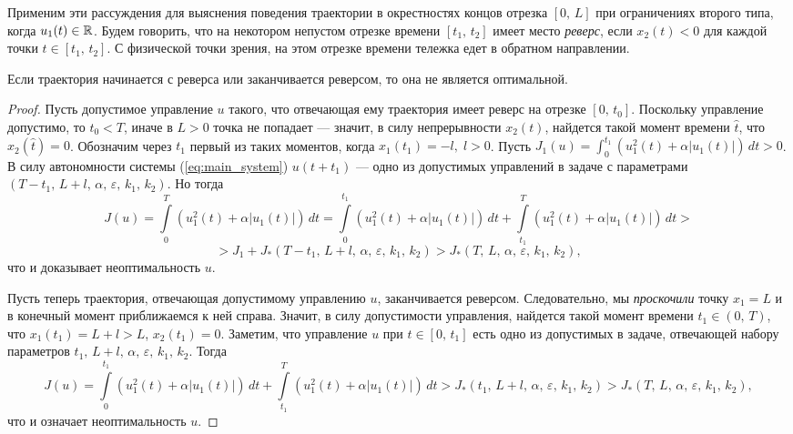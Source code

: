Применим эти рассуждения для выяснения поведения траектории в окрестностях концов отрезка $[0,\,L]$ при ограничениях второго типа, когда $u_1(t) \in \mathbb{R}$. Будем говорить, что на некотором непустом отрезке времени $[t_1,\,t_2]$ имеет место \textit{реверс}, если $x_2(t) < 0$ для каждой точки $t \in [t_1,\,t_2]$. С физической точки зрения, на этом отрезке времени тележка едет в обратном направлении.

\begin{assertion}
Если траектория начинается с реверса или заканчивается реверсом, то она не является оптимальной.
\end{assertion}
\begin{proof}
        Пусть допустимое управление $u$ такого, что отвечающая ему траектория имеет реверс на отрезке $[0,\,t_0]$. Поскольку управление допустимо, то $t_0 < T$, иначе в $L > 0$ точка не попадает --- значит, в силу непрерывности $x_2(t)$, найдется такой момент времени $\hat t$, что $x_2(\hat t) = 0$. Обозначим через $t_1$ первый из таких моментов, когда $x_1(t_1)=-l,\;l>0$. Пусть $J_1(u) = \int_0^{t_1}(u_1^2(t) + \alpha|u_1(t)|)\,dt > 0$. В силу автономности системы (\ref{eq:main_system}) $u(t + t_1)$ --- одно из допустимых управлений в задаче с параметрами $(T-t_1,\, L+l,\,\alpha,\,\varepsilon,\,k_1,\,k_2)$. Но тогда
        $$
                J(u) = \int\limits_0^T (u_1^2(t) + \alpha|u_1(t)|)\,dt = \int\limits_0^{t_1} (u_1^2(t) + \alpha|u_1(t)|)\,dt + \int\limits_{t_1}^T (u_1^2(t) + \alpha|u_1(t)|)\,dt >
        $$
        $$
                > J_1 + J_*(T-t_1,\,L+l,\,\alpha,\,\varepsilon,\,k_1,\,k_2) > J_*(T,\,L,\,\alpha,\,\varepsilon,\,k_1,\,k_2),
        $$
        что и доказывает неоптимальность $u$.

        Пусть теперь траектория, отвечающая допустимому управлению $u$, заканчивается реверсом. Следовательно, мы \textit{проскочили} точку $x_1 = L$ и в конечный момент приближаемся к ней справа. Значит, в силу допустимости управления, найдется такой момент времени $t_1 \in (0,\,T)$, что $x_1(t_1) = L + l > L$, $x_2(t_1) = 0$. Заметим, что управление $u$ при $t \in [0,\,t_1]$ есть одно из допустимых в задаче, отвечающей набору параметров $t_1,\,L+l,\,\alpha,\,\varepsilon,\,k_1,\,k_2$. Тогда
        $$
                J(u) = \int\limits_0^{t_1} (u_1^2(t) + \alpha|u_1(t)|)\,dt + \int\limits_{t_1}^T (u_1^2(t) + \alpha|u_1(t)|)\,dt > J_*(t_1,\,L+l,\,\alpha,\,\varepsilon,\,k_1,\,k_2) > J_*(T,\,L,\,\alpha,\,\varepsilon,\,k_1,\,k_2),
        $$
        что и означает неоптимальность $u$.
\end{proof}